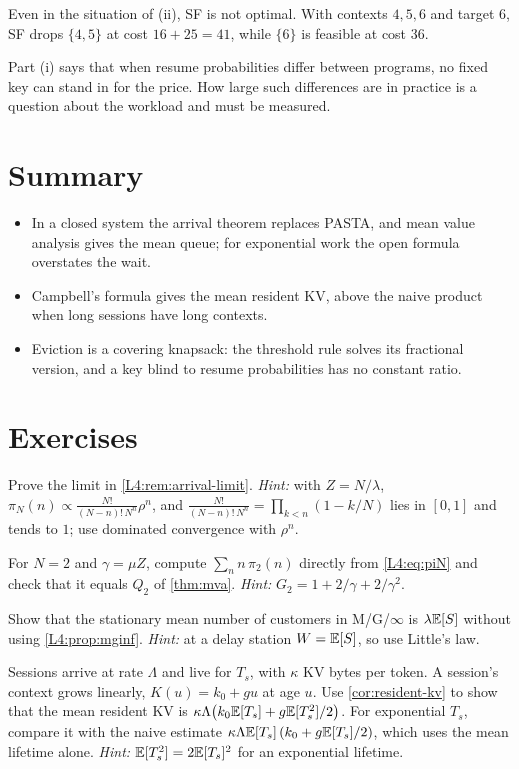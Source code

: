 \begin{example}\label{L4:ex:sf}
Even in the situation of (ii), SF is not optimal. With contexts $4,5,6$ and target
$6$, SF drops $\{4,5\}$ at cost $16+25=41$, while $\{6\}$ is feasible at cost $36$.
\end{example}

Part (i) says that when resume probabilities differ between programs, no fixed
key can stand in for the price. How large such differences are in practice is a
question about the workload and must be measured.

\section{Summary}
\begin{itemize}
\item In a closed system the arrival theorem replaces PASTA, and mean value analysis gives the mean queue; for exponential work the open formula overstates the wait.
\item Campbell's formula gives the mean resident KV, above the naive product when long sessions have long contexts.
\item Eviction is a covering knapsack: the threshold rule solves its fractional version, and a key blind to resume probabilities has no constant ratio.
\end{itemize}

\section{Exercises}

\begin{exercise}\label{L4:ex:limit}
Prove the limit in \cref{L4:rem:arrival-limit}.
\emph{Hint:} with $Z=N/\lambda$, $\pi_N(n)\propto\frac{N!}{(N-n)!\,N^n}\rho^n$, and
$\frac{N!}{(N-n)!\,N^n}=\prod_{k<n}(1-k/N)$ lies in $[0,1]$ and tends to $1$; use
dominated convergence with $\rho^n$.
\end{exercise}

\begin{exercise}
For $N=2$ and $\gamma=\mu Z$, compute $\sum_nn\,\pi_2(n)$ directly from
\eqref{L4:eq:piN} and check that it equals $Q_2$ of \cref{thm:mva}.
\emph{Hint:} $G_2=1+2/\gamma+2/\gamma^2$.
\end{exercise}

\begin{exercise}
Show that the stationary mean number of customers in M/G/$\infty$ is $\lambda\mathbb{E}[S]$
without using \cref{L4:prop:mginf}.
\emph{Hint:} at a delay station $W=\mathbb{E}[S]$, so use Little's law.
\end{exercise}

\begin{exercise}\label{L4:ex:growing}
Sessions arrive at rate $\Lambda$ and live for $T_s$, with $\kappa$ KV bytes per token. A session's context grows
linearly, $K(u)=k_0+gu$ at age $u$. Use \cref{cor:resident-kv} to show that the mean
resident KV is $\kappa\Lambda\bigl(k_0\mathbb{E}[T_s]+g\mathbb{E}[T_s^2]/2\bigr)$. For exponential $T_s$,
compare it with the naive estimate $\kappa\Lambda\mathbb{E}[T_s]\,(k_0+g\mathbb{E}[T_s]/2)$, which uses
the mean lifetime alone.
\emph{Hint:} $\mathbb{E}[T_s^2]=2\mathbb{E}[T_s]^2$ for an exponential lifetime.
\end{exercise}

